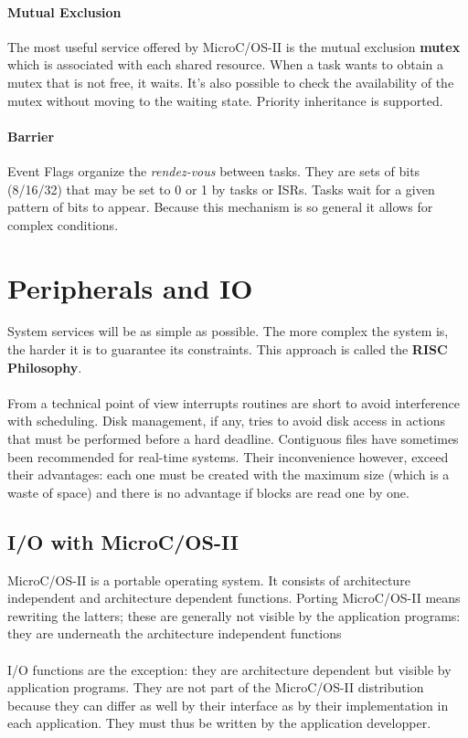 \documentclass[../main.tex]{subfiles}
\begin{document}
\paragraph{Mutual Exclusion} The most useful service offered by MicroC/OS-II is the mutual exclusion \textbf{mutex} which is associated with each shared resource. When a task wants to obtain a mutex that is not free, it waits. It's also possible to check the availability of the mutex without moving to the waiting state. Priority inheritance is supported.

\paragraph{Barrier} Event Flags organize the \textit{rendez-vous} between tasks. They are sets of bits (8/16/32) that may be set to 0 or 1 by tasks or ISRs. Tasks wait for a given pattern of bits to appear. Because this mechanism is so general it allows for complex conditions. 

\section{Peripherals and IO}
System services will be as simple as possible. The more complex the system is, the harder it is to guarantee its constraints. This approach is called the \textbf{RISC Philosophy}. 
\\\\
From a technical point of view interrupts routines are short to avoid interference with scheduling. Disk management, if any, tries to avoid disk access in actions that must be performed before a hard deadline. Contiguous files have sometimes been recommended for real-time systems. Their inconvenience however, exceed their advantages: each one must be created with the maximum size (which is a waste of space) and there is no advantage if blocks are read one by one.

\subsection{I/O with MicroC/OS-II}
MicroC/OS-II is a portable operating system. It consists of architecture independent and architecture dependent functions. Porting MicroC/OS-II means rewriting the latters; these are generally not visible by the application programs: they are underneath the architecture independent functions
\\\\
I/O functions are the exception: they are architecture dependent but visible by application programs. They are not part of the MicroC/OS-II distribution because they can differ as well by their interface as by their implementation in each application. They must thus be written by the application developper.
\end{document}
